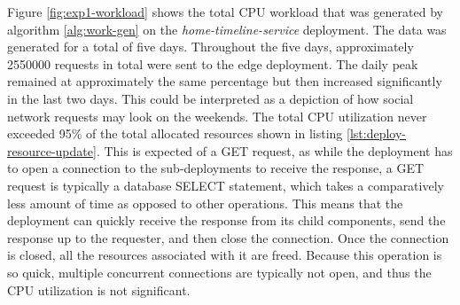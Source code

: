 \begin{center}
\begin{minipage}{\linewidth}
    \label{fig:exp1-workload}
\end{minipage}
\end{center}

Figure \ref{fig:exp1-workload} shows the total CPU workload that was generated by algorithm \ref{alg:work-gen} on the \textit{home-timeline-service} deployment. The data was generated for a total of five days. Throughout the five days, approximately \num[group-separator={,}]{2550000} requests in total were sent to the edge deployment. The daily peak remained at approximately the same percentage but then increased significantly in the last two days. This could be interpreted as a depiction of how social network requests may look on the weekends. The total CPU utilization never exceeded 95\% of the total allocated resources shown in listing \ref{lst:deploy-resource-update}. This is expected of a GET request, as while the deployment has to open a connection to the sub-deployments to receive the response, a GET request is typically a database SELECT statement, which takes a comparatively less amount of time as opposed to other operations. This means that the deployment can quickly receive the response from its child components, send the response up to the requester, and then close the connection. Once the connection is closed, all the resources associated with it are freed. Because this operation is so quick, multiple concurrent connections are typically not open, and thus the CPU utilization is not significant.\par

